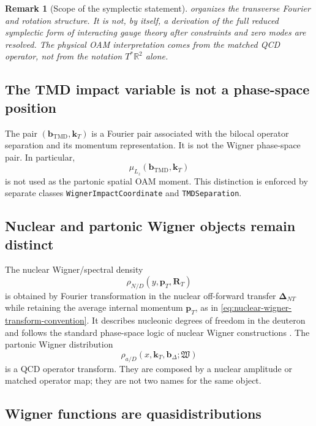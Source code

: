 \documentclass[11pt]{article}
\newtheorem{remark}[definition]{Remark}
\newcommand{\kT}{\bm{k}_{T}}
\newcommand{\pT}{\bm{p}_{T}}
\newcommand{\DNT}{\bm{\Delta}_{N T}}
\newcommand{\bD}{\bm{b}_{\Delta}}
\newcommand{\bM}{\bm{b}_{\mathrm{TMD}}}
\newcommand{\RT}{\bm{R}_{T}}
\begin{document}
\begin{remark}[Scope of the symplectic statement]
 organizes the transverse Fourier and
rotation structure.  It is not, by itself, a derivation of the full reduced
symplectic form of interacting gauge theory after constraints and zero modes
are resolved.  The physical OAM interpretation comes from the matched QCD
operator, not from the notation \(T^*\mathbb R^2\) alone.
\end{remark}

\subsection{The TMD impact variable is not a phase-space position}

The pair \((\bM,\kT)\) is a Fourier pair associated with the bilocal operator
separation and its momentum representation.  It is not the Wigner
phase-space pair.  In particular,
\begin{equation}
 \mu_{L_z}(\bM,\kT)
\end{equation}
is not used as the partonic spatial OAM moment.  This distinction is enforced
by separate classes \texttt{WignerImpactCoordinate} and
\texttt{TMDSeparation}.

\subsection{Nuclear and partonic Wigner objects remain distinct}

The nuclear Wigner/spectral density
\begin{equation}
 \rho_{N/D}(y,\pT,\RT)
\label{eq:nuclear-wigner-density}
\end{equation}
is obtained by Fourier transformation in the nuclear off-forward transfer \(\DNT\) while retaining the average internal momentum \(\pT\), as in \cref{eq:nuclear-wigner-transform-convention}.  It describes nucleonic degrees of freedom in the deuteron and follows the standard phase-space logic of nuclear Wigner constructions \cite{Neff2016}.  The partonic Wigner
distribution
\begin{equation}
 \rho_{a/D}(x,\kT,\bD;\mathfrak W)
\label{eq:partonic-wigner-density}
\end{equation}
is a QCD operator transform.  They are composed by a nuclear amplitude or
matched operator map; they are not two names for the same object.

\subsection{Wigner functions are quasidistributions}
\end{document}
